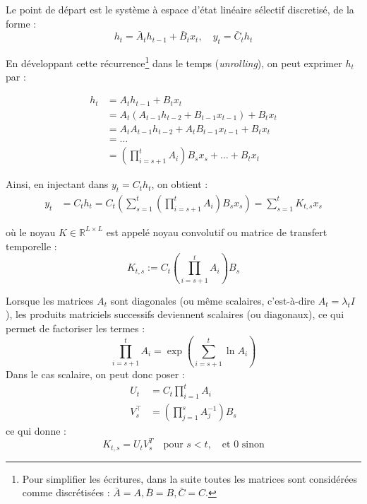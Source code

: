 Le point de départ est le système à espace d'état linéaire sélectif discretisé, de la forme :
\begin{equation}
    h_t = \bar{A}_t h_{t-1} + \bar{B}_t x_t, \quad y_t = \bar{C}_t h_t
\end{equation}

En développant cette récurrence\footnote{Pour simplifier les écritures, dans la suite toutes les matrices sont considérées comme discrétisées : $\bar{A} = A, \bar{B}=B, \bar{C}=C$.} dans le temps (\textit{unrolling}), on peut exprimer $h_t$ par :

\begin{equation}
\begin{split}
    h_t &= A_t h_{t-1} + B_t x_t \\
        &= A_t (A_{t-1} h_{t-2} + B_{t-1} x_{t-1}) + B_t x_t \\
        &= A_t A_{t-1} h_{t-2} + A_t B_{t-1} x_{t-1} + B_t x_t \\
        &= \dots \\
        &= \left(\prod_{i=s+1}^{t} A_i\right) B_s x_s + \dots + B_t x_t
\end{split}
\end{equation}

Ainsi, en injectant dans $y_t = C_t h_t$, on obtient :
\begin{align}
    y_t &= C_t h_t = C_t \left( \sum_{s=1}^{t} \left( \prod_{i=s+1}^{t} A_i \right) B_s x_s \right) = \sum_{s=1}^t K_{t,s} x_s
\end{align}

où le noyau $K \in \mathbb{R}^{L \times L}$ est appelé noyau convolutif ou matrice de transfert temporelle :
\begin{equation}
    K_{t,s} := C_t \left(\prod_{i=s+1}^{t} A_i\right) B_s
\end{equation}

Lorsque les matrices $A_t$ sont diagonales (ou m\^eme scalaires, c'est-à-dire $A_t = \lambda_t I$), les produits matriciels successifs deviennent scalaires (ou diagonaux), ce qui permet de factoriser les termes :
\begin{equation}
    \prod_{i=s+1}^t A_i = \exp\left(\sum_{i=s+1}^t \ln A_i\right)
\end{equation}
Dans le cas scalaire, on peut donc poser :
\begin{align*}
    U_t &= C_t \prod_{i=1}^t A_i \\
    V_s^\top &= \left(\prod_{j=1}^s A_j^{-1}\right) B_s
\end{align*}
ce qui donne :
\begin{equation}
    K_{t,s} = U_t V_s^T \quad \text{pour } s < t, \quad \text{et } 0 \text{ sinon}
\end{equation}

